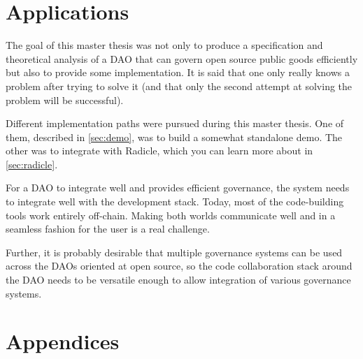 \documentclass[english]{yMasterThesis}
\begin{document}







\part{Applications}

\partSecondPage%
The goal of this master thesis was not only to produce a specification and theoretical analysis of a DAO that can govern open source public goods efficiently but also to provide some implementation.
It is said that one only really knows a problem after trying to solve it (and that only the second attempt at solving the problem will be successful).

Different implementation paths were pursued during this master thesis.
One of them, described in \cref{sec:demo}, was to build a somewhat standalone demo.
The other was to integrate with Radicle, which you can learn more about in \cref{sec:radicle}.

For a DAO to integrate well and provides efficient governance, the system needs to integrate well with the development stack.
Today, most of the code-building tools work entirely off-chain.
Making both worlds communicate well and in a seamless fashion for the user is a real challenge.

Further, it is probably desirable that multiple governance systems can be used across the DAOs oriented at open source, so the code collaboration stack around the DAO needs to be versatile enough to allow integration of various governance systems.






\part{Appendices}

\appendix



\printbibliography
\end{document}
